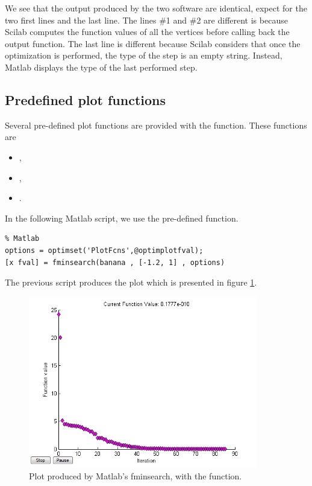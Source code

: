 We see that the output produced by the two software are identical,
expect for the two first lines and the last line.
The lines \#1 and \#2 are different is because Scilab computes the 
function values of all the vertices before calling back the output function.
The last line is different because Scilab considers that once the optimization
is performed, the type of the step is an empty string. Instead, Matlab
displays the type of the last performed step.

\subsection{Predefined plot functions}

Several pre-defined plot functions are provided with 
the  function.
These functions are 
\begin{itemize}
\item {},
\item {},
\item {}.
\end{itemize}

In the following Matlab script, we use the 
pre-defined function.

\lstset{language=matlabscript}
\begin{lstlisting}
% Matlab
options = optimset('PlotFcns',@optimplotfval);
[x fval] = fminsearch(banana , [-1.2, 1] , options)
\end{lstlisting}

The previous script produces the plot which is presented in figure 
\ref{fig-fminsearch-matlab-optimplotfval}.

\begin{figure}
\begin{center}
\includegraphics[width=10cm]{testFminsearchOptimplotfvalMatlab.png}
\end{center}
\caption{Plot produced by Matlab's fminsearch, with the  function.}
\label{fig-fminsearch-matlab-optimplotfval}
\end{figure}

